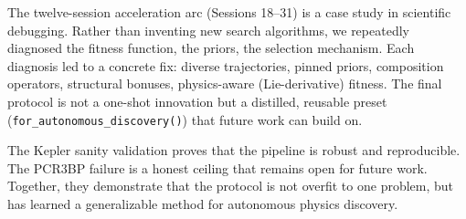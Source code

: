 The twelve-session acceleration arc (Sessions 18--31) is a case study in scientific debugging. Rather than inventing new search algorithms, we repeatedly diagnosed the fitness function, the priors, the selection mechanism. Each diagnosis led to a concrete fix: diverse trajectories, pinned priors, composition operators, structural bonuses, physics-aware (Lie-derivative) fitness. The final protocol is not a one-shot innovation but a distilled, reusable preset (\texttt{for\_autonomous\_discovery()}) that future work can build on.

The Kepler sanity validation proves that the pipeline is robust and reproducible. The PCR3BP failure is a honest ceiling that remains open for future work. Together, they demonstrate that the protocol is not overfit to one problem, but has learned a generalizable method for autonomous physics discovery.

